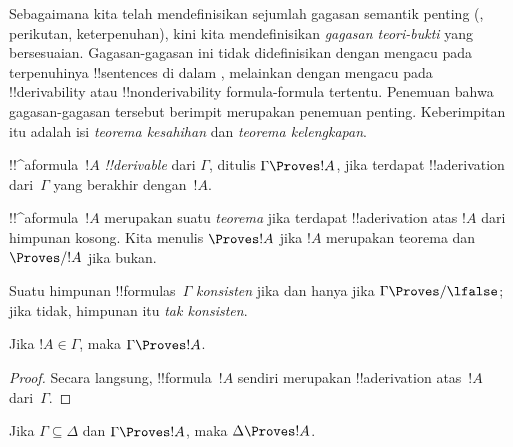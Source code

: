 \documentclass[../../../include/open-logic-section]{subfiles}
\begin{document}
      {}
      {}


\begin{explain}
Sebagaimana kita telah mendefinisikan sejumlah gagasan semantik penting
(, perikutan, keterpenuhan), kini kita
mendefinisikan \emph{gagasan teori-bukti} yang bersesuaian.
Gagasan-gagasan ini tidak didefinisikan dengan mengacu pada terpenuhinya
!!{sentence}s di dalam ,
melainkan dengan mengacu pada !!{derivability} atau
!!{nonderivability} formula-formula tertentu. Penemuan bahwa
gagasan-gagasan tersebut berimpit merupakan penemuan penting.
Keberimpitan itu adalah isi \emph{teorema kesahihan} dan
\emph{teorema kelengkapan}.
\end{explain}

\begin{defn}[!!^{derivability}]
!!^a{formula}~$!A$
\emph{!!{derivable}} dari $\Gamma$, ditulis $\Gamma \Proves !A$, jika
terdapat !!a{derivation} dari~$\Gamma$ yang berakhir dengan~$!A$.
\end{defn}

\begin{defn}[Teorema]
!!^a{formula}~$!A$ merupakan suatu \emph{teorema} jika terdapat
!!a{derivation} atas $!A$ dari himpunan kosong. Kita menulis
$\Proves !A$ jika $!A$ merupakan teorema dan $\Proves/ !A$ jika bukan.
\end{defn}

\begin{defn}[Konsistensi]
Suatu himpunan !!{formula}s~$\Gamma$ \emph{konsisten} jika dan hanya
jika $\Gamma\Proves/ \lfalse$; jika tidak, himpunan itu
\emph{tak konsisten}.
\end{defn}

\begin{prop}[Refleksivitas]
Jika $!A \in \Gamma$, maka $\Gamma \Proves !A$.
\end{prop}

\begin{proof}
  Secara langsung, !!{formula}~$!A$ sendiri merupakan !!a{derivation} atas~$!A$
  dari~$\Gamma$.
\end{proof}

\begin{prop}[Monotonisitas]
Jika $\Gamma \subseteq \Delta$ dan $\Gamma \Proves !A$, maka $\Delta
\Proves !A$.
\end{prop}
\end{document}

